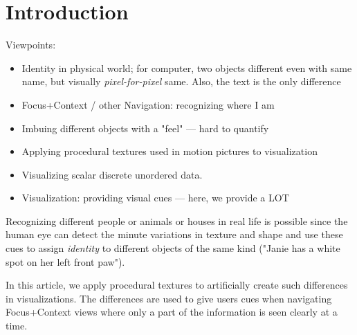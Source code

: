 \documentclass[twocolumn]{IV02}
\begin{document}

\def\vob{{\tt Vob}}
\def\vobscene{{\tt VobScene}}
\def\view{{\tt View}}
\def\key{{\tt key}}
\def\diff{{\tt diff}}

\def\unfin{\tiny}
\def\fin{\normalsize}


\section{Introduction}

Viewpoints:
\begin{itemize}
\item Identity in physical world; 
    for computer, two objects different even with same name, but
    visually {\em pixel-for-pixel} same.
    Also, the text is the only difference
\item Focus+Context / other Navigation: recognizing where I am
\item Imbuing different objects with a "feel" --- hard to quantify
\item Applying procedural textures used in motion pictures to visualization
\item Visualizing scalar discrete unordered data.
\item Visualization: providing visual cues --- here, we provide a LOT
\end{itemize}

Recognizing different people or animals or houses in real life
is possible since
the human eye can detect the minute variations in texture and shape
and use these cues to assign {\em identity} to different
objects of the same kind ("Janie has a white spot on her left front paw").

In this article, we apply procedural textures to artificially
create such differences in visualizations. 
The differences are used to give users 
cues when navigating
Focus+Context views where only a part of the information
is seen clearly at a time.
\end{document}
